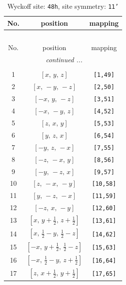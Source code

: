 \documentclass[fleqn,8pt]{jsarticle}
\begin{document}
\renewcommand{\arraystretch}{1.2}
\begin{longtable}{ccc}
\caption{Wyckoff site: {\tt 48h}, site symmetry: {\tt 11'}}
 \\
 \hline \hline
No. & position & mapping \\ \hline \endfirsthead

\multicolumn{2}{l}{\tablename\ \thetable{}} \\
 \hline \hline
No. & position & mapping \\ \hline \endhead

 \hline \hline
\multicolumn{2}{r}{\footnotesize\it continued ...} \\ \endfoot

 \hline \hline
\multicolumn{2}{r}{} \\ \endlastfoot

1 & $\left[ x,\, y,\, z \right]$ & {\tt [1,49]} \\ \hline
2 & $\left[ x,\, - y,\, - z \right]$ & {\tt [2,50]} \\ \hline
3 & $\left[ - x,\, y,\, - z \right]$ & {\tt [3,51]} \\ \hline
4 & $\left[ - x,\, - y,\, z \right]$ & {\tt [4,52]} \\ \hline
5 & $\left[ z,\, x,\, y \right]$ & {\tt [5,53]} \\ \hline
6 & $\left[ y,\, z,\, x \right]$ & {\tt [6,54]} \\ \hline
7 & $\left[ - y,\, z,\, - x \right]$ & {\tt [7,55]} \\ \hline
8 & $\left[ - z,\, - x,\, y \right]$ & {\tt [8,56]} \\ \hline
9 & $\left[ - y,\, - z,\, x \right]$ & {\tt [9,57]} \\ \hline
10 & $\left[ z,\, - x,\, - y \right]$ & {\tt [10,58]} \\ \hline
11 & $\left[ y,\, - z,\, - x \right]$ & {\tt [11,59]} \\ \hline
12 & $\left[ - z,\, x,\, - y \right]$ & {\tt [12,60]} \\ \hline
13 & $\left[ x,\, y + \frac{1}{2},\, z + \frac{1}{2} \right]$ & {\tt [13,61]} \\ \hline
14 & $\left[ x,\, \frac{1}{2} - y,\, \frac{1}{2} - z \right]$ & {\tt [14,62]} \\ \hline
15 & $\left[ - x,\, y + \frac{1}{2},\, \frac{1}{2} - z \right]$ & {\tt [15,63]} \\ \hline
16 & $\left[ - x,\, \frac{1}{2} - y,\, z + \frac{1}{2} \right]$ & {\tt [16,64]} \\ \hline
17 & $\left[ z,\, x + \frac{1}{2},\, y + \frac{1}{2} \right]$ & {\tt [17,65]} \\ \hline

\end{longtable}
\end{document}
